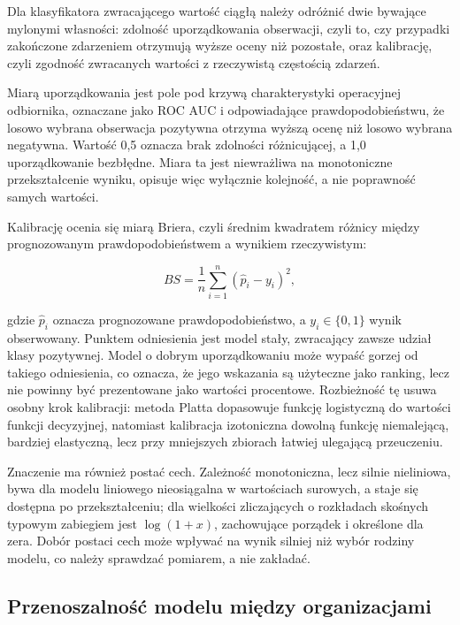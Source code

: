 Dla klasyfikatora zwracającego wartość ciągłą należy odróżnić dwie bywające mylonymi własności: zdolność uporządkowania obserwacji, czyli to, czy przypadki zakończone zdarzeniem otrzymują wyższe oceny niż pozostałe, oraz kalibrację, czyli zgodność zwracanych wartości z rzeczywistą częstością zdarzeń.

Miarą uporządkowania jest pole pod krzywą charakterystyki operacyjnej odbiornika, oznaczane jako ROC AUC i odpowiadające prawdopodobieństwu, że losowo wybrana obserwacja pozytywna otrzyma wyższą ocenę niż losowo wybrana negatywna. Wartość 0,5 oznacza brak zdolności różnicującej, a 1,0 uporządkowanie bezbłędne. Miara ta jest niewrażliwa na monotoniczne przekształcenie wyniku, opisuje więc wyłącznie kolejność, a nie poprawność samych wartości.

Kalibrację ocenia się miarą Briera, czyli średnim kwadratem różnicy między prognozowanym prawdopodobieństwem a wynikiem rzeczywistym:

\begin{equation}
    BS = \frac{1}{n}\sum_{i=1}^{n}\left(\hat{p}_i - y_i\right)^2,
    \label{eq:brier}
\end{equation}

gdzie \(\hat{p}_i\) oznacza prognozowane prawdopodobieństwo, a \(y_i \in \{0,1\}\) wynik obserwowany. Punktem odniesienia jest model stały, zwracający zawsze udział klasy pozytywnej. Model o dobrym uporządkowaniu może wypaść gorzej od takiego odniesienia, co oznacza, że jego wskazania są użyteczne jako ranking, lecz nie powinny być prezentowane jako wartości procentowe. Rozbieżność tę usuwa osobny krok kalibracji: metoda Platta dopasowuje funkcję logistyczną do wartości funkcji decyzyjnej, natomiast kalibracja izotoniczna dowolną funkcję niemalejącą, bardziej elastyczną, lecz przy mniejszych zbiorach łatwiej ulegającą przeuczeniu.

Znaczenie ma również postać cech. Zależność monotoniczna, lecz silnie nieliniowa, bywa dla modelu liniowego nieosiągalna w wartościach surowych, a staje się dostępna po przekształceniu; dla wielkości zliczających o rozkładach skośnych typowym zabiegiem jest \(\log(1+x)\), zachowujące porządek i określone dla zera. Dobór postaci cech może wpływać na wynik silniej niż wybór rodziny modelu, co należy sprawdzać pomiarem, a nie zakładać.

\subsection*{Przenoszalność modelu między organizacjami}

